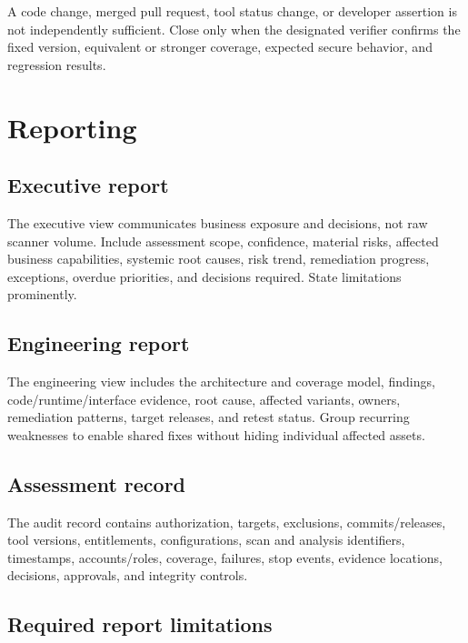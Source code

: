 \documentclass[11pt,letterpaper]{article}
\begin{document}
\begin{decisionbox}
A code change, merged pull request, tool status change, or developer assertion is not independently sufficient. Close only when the designated verifier confirms the fixed version, equivalent or stronger coverage, expected secure behavior, and regression results.
\end{decisionbox}

\section{Reporting}

\subsection{Executive report}

The executive view communicates business exposure and decisions, not raw scanner volume. Include assessment scope, confidence, material risks, affected business capabilities, systemic root causes, risk trend, remediation progress, exceptions, overdue priorities, and decisions required. State limitations prominently.

\subsection{Engineering report}

The engineering view includes the architecture and coverage model, findings, code/runtime/interface evidence, root cause, affected variants, owners, remediation patterns, target releases, and retest status. Group recurring weaknesses to enable shared fixes without hiding individual affected assets.

\subsection{Assessment record}

The audit record contains authorization, targets, exclusions, commits/releases, tool versions, entitlements, configurations, scan and analysis identifiers, timestamps, accounts/roles, coverage, failures, stop events, evidence locations, decisions, approvals, and integrity controls.

\subsection{Required report limitations}
\end{document}
